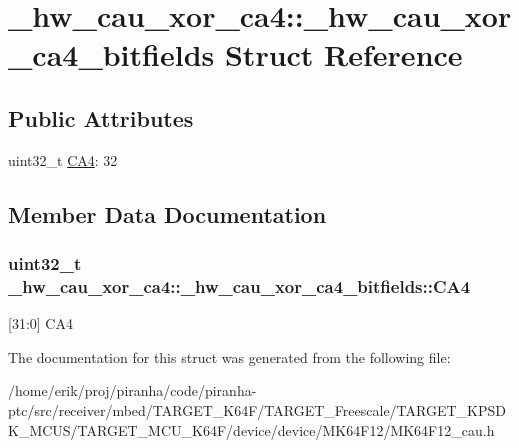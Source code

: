 \hypertarget{struct__hw__cau__xor__ca4_1_1__hw__cau__xor__ca4__bitfields}{}\section{\+\_\+hw\+\_\+cau\+\_\+xor\+\_\+ca4\+:\+:\+\_\+hw\+\_\+cau\+\_\+xor\+\_\+ca4\+\_\+bitfields Struct Reference}
\label{struct__hw__cau__xor__ca4_1_1__hw__cau__xor__ca4__bitfields}
\subsection*{Public Attributes}
\begin{DoxyCompactItemize}
\item 
uint32\+\_\+t \hyperlink{struct__hw__cau__xor__ca4_1_1__hw__cau__xor__ca4__bitfields_a0a2fe6a31be259d7551a225fda02364a}{C\+A4}\+: 32
\end{DoxyCompactItemize}


\subsection{Member Data Documentation}
\subsubsection[{\texorpdfstring{C\+A4}{CA4}}]{\setlength{\rightskip}{0pt plus 5cm}uint32\+\_\+t \+\_\+hw\+\_\+cau\+\_\+xor\+\_\+ca4\+::\+\_\+hw\+\_\+cau\+\_\+xor\+\_\+ca4\+\_\+bitfields\+::\+C\+A4}\hypertarget{struct__hw__cau__xor__ca4_1_1__hw__cau__xor__ca4__bitfields_a0a2fe6a31be259d7551a225fda02364a}{}\label{struct__hw__cau__xor__ca4_1_1__hw__cau__xor__ca4__bitfields_a0a2fe6a31be259d7551a225fda02364a}
\mbox{[}31\+:0\mbox{]} C\+A4 

The documentation for this struct was generated from the following file\+:\begin{DoxyCompactItemize}
\item 
/home/erik/proj/piranha/code/piranha-\/ptc/src/receiver/mbed/\+T\+A\+R\+G\+E\+T\+\_\+\+K64\+F/\+T\+A\+R\+G\+E\+T\+\_\+\+Freescale/\+T\+A\+R\+G\+E\+T\+\_\+\+K\+P\+S\+D\+K\+\_\+\+M\+C\+U\+S/\+T\+A\+R\+G\+E\+T\+\_\+\+M\+C\+U\+\_\+\+K64\+F/device/device/\+M\+K64\+F12/M\+K64\+F12\+\_\+cau.\+h\end{DoxyCompactItemize}
